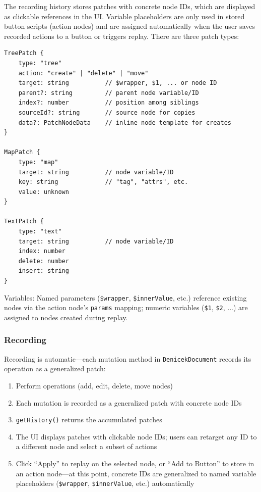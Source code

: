 \documentclass{article}
\begin{document}
The recording history stores patches with concrete node IDs, which are displayed as clickable references in the UI. Variable placeholders are only used in stored button scripts (action nodes) and are assigned automatically when the user saves recorded actions to a button or triggers replay. There are three patch types:

\begin{verbatim}
TreePatch {
    type: "tree"
    action: "create" | "delete" | "move"
    target: string          // $wrapper, $1, ... or node ID
    parent?: string         // parent node variable/ID
    index?: number          // position among siblings
    sourceId?: string       // source node for copies
    data?: PatchNodeData    // inline node template for creates
}

MapPatch {
    type: "map"
    target: string          // node variable/ID
    key: string             // "tag", "attrs", etc.
    value: unknown
}

TextPatch {
    type: "text"
    target: string          // node variable/ID
    index: number
    delete: number
    insert: string
}
\end{verbatim}

Variables: Named parameters (\texttt{\$wrapper}, \texttt{\$innerValue}, etc.) reference existing nodes via the action node's \texttt{params} mapping; numeric variables (\texttt{\$1}, \texttt{\$2}, ...) are assigned to nodes created during replay.

\subsubsection{Recording}

Recording is automatic---each mutation method in \texttt{DenicekDocument} records its operation as a generalized patch:
\begin{enumerate}
\item Perform operations (add, edit, delete, move nodes)
\item Each mutation is recorded as a generalized patch with concrete node IDs
\item \texttt{getHistory()} returns the accumulated patches
\item The UI displays patches with clickable node IDs; users can retarget any ID to a different node and select a subset of actions
\item Click ``Apply'' to replay on the selected node, or ``Add to Button'' to store in an action node---at this point, concrete IDs are generalized to named variable placeholders (\texttt{\$wrapper}, \texttt{\$innerValue}, etc.) automatically
\end{enumerate}
\end{document}
